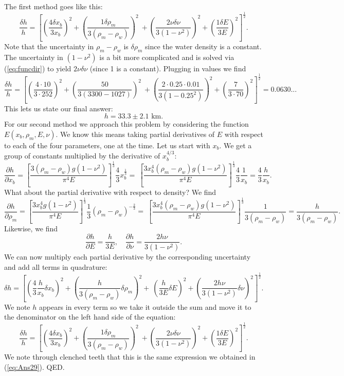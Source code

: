 The first method goes like this:
\begin{equation}
\frac{\delta h}{h} = \left [ \left(\frac{4 \delta x_b}{3 x_b}\right)^2 + \left(\frac{1 \delta \rho_m}{3 (\rho_m - \rho_w)}\right)^2 \
	+ \left(\frac{2 \nu \delta \nu}{3 (1-\nu^2)}\right)^2 + \left(\frac{1 \delta E}{3 E}\right)^2 \right ]^\frac{1}{2}.
\label{eq:Ans29}
\end{equation}
Note that the uncertainty in $\rho_m - \rho_w$ is $\delta \rho_m$ since the water density is a constant.
The uncertainty in $(1-\nu^2)$ is a bit more complicated and is solved via (\ref{eq:funcdir}) to yield
$2\nu \delta \nu$ (since 1 is a constant).  Plugging in values we find
$$
\frac{\delta h}{h} = \left [ \left(\frac{4\cdot10}{3\cdot252}\right)^2 + \left(\frac{50}{3 (3300 - 1027)}\right)^2 \
	+ \left(\frac{2\cdot0.25\cdot0.01}{3 (1-0.25^2)}\right)^2 + \left(\frac{7}{3\cdot70}\right)^2 \right ]^\frac{1}{2} = 0.0630...
$$
This lets us state our final answer:
$$
h = 33.3 \pm 2.1\mbox{ km}.
$$
For our second method we approach this problem by considering the function $E(x_b, \rho_m, E, \nu)$.  We know this means taking
partial derivatives of $E$ with respect to each of the four parameters, one at the time.  Let us start with $x_b$.
We get a group of constants multiplied by the derivative of $x_b^{4/3}$:
$$
\frac{\partial h}{\partial x_b} = \left [ \frac{3 (\rho_m - \rho_w)g(1 - \nu^2)}{\pi^4 E} \right ]^\frac{1}{3} \frac{4}{3} x_b^\frac{1}{3} = \
\left [ \frac{3 x_b^4 (\rho_m - \rho_w)g(1 - \nu^2)}{\pi^4 E} \right ]^\frac{1}{3} \frac{4}{3} \frac{1}{x_b} = \frac{4}{3}\frac{h}{x_b}.
$$
What about the partial derivative with respect to density? We find
$$
\frac{\partial h}{\partial \rho_m} = \left [ \frac{3  x_b^4g(1 - \nu^2)}{\pi^4 E} \right ]^\frac{1}{3} \frac{1}{3} (\rho_m - \rho_w)^{-\frac{2}{3}} = \
\left [ \frac{3 x_b^4 (\rho_m - \rho_w)g(1 - \nu^2)}{\pi^4 E} \right ]^\frac{1}{3} \frac{1}{3(\rho_m - \rho_w)} = \frac{h}{3(\rho_m - \rho_w)}.
$$
Likewise, we find
$$
\frac{\partial h}{\partial E}  = \frac{h}{3E}, \quad \frac{\partial h}{\partial \nu}  = \frac{2h\nu}{3(1-\nu^2)}.
$$
We can now multiply each partial derivative by the corresponding uncertainty and add all terms in quadrature:
$$
\delta h = \left [ \left (\frac{4}{3}\frac{h}{x_b}\delta x_b\right)^2 +  \left (\frac{h}{3(\rho_m - \rho_w)}\delta \rho_m\right)^2 +  \
\left (\frac{h}{3E}\delta E\right)^2 + \left (\frac{2h\nu}{3(1-\nu^2)}\delta \nu\right)^2 \right ]^\frac{1}{2}.
$$
We note $h$ appears in every term so we take it outside the sum and move it to the denominator on the left hand side of the equation:
$$
\frac{\delta h}{h} = \left [ \left(\frac{4 \delta x_b}{3 x_b}\right)^2 + \left(\frac{1 \delta \rho_m}{3 (\rho_m - \rho_w)}\right)^2 \
	+ \left(\frac{2 \nu \delta \nu}{3 (1-\nu^2)}\right)^2 + \left(\frac{1 \delta E}{3 E}\right)^2 \right ]^\frac{1}{2}.
$$
We note through clenched teeth that this is the same expression we obtained in (\ref{eq:Ans29}). QED.
\\

